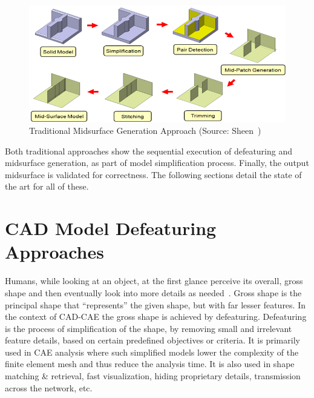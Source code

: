 
	\begin{figure} [!h]
		\centering
		\includegraphics[width=0.9\linewidth]{images/MidsurfaceProposedApproach}
		\caption{Traditional Midsurface Generation Approach (Source: Sheen~\cite{Sheen2005})}
		\label{fig:introduction:tradmidsurfgen}
	\end{figure} 


Both traditional approaches show the sequential execution of defeaturing and midsurface generation, as part of model simplification process. Finally, the output midsurface is validated for correctness. The following sections detail the state of the art for all of these.

\section{CAD Model Defeaturing Approaches} \label{sec:survey:defeat}

Humans, while looking at an object, at the first glance perceive its overall, gross shape and then eventually look into more details as needed~\cite{LeeLee1998}. Gross shape is the principal shape that ``represents'' the given shape, but with far lesser features. In the context of CAD-CAE the gross shape is achieved by defeaturing. Defeaturing is the process of simplification of the shape, by removing small and irrelevant feature details,  based on certain predefined objectives or criteria. It is primarily used in CAE analysis where such simplified models lower the complexity of the finite element mesh and thus reduce the analysis time. It is also used in shape matching \& retrieval, fast visualization, hiding proprietary details, transmission across the network, etc. 


	
